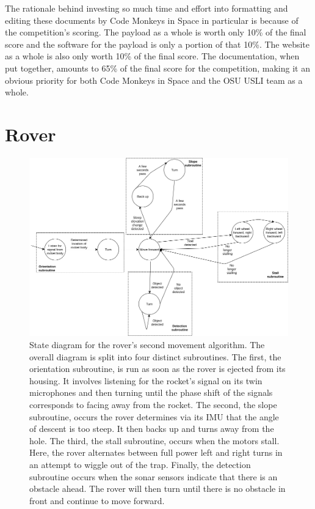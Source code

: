 \documentclass[onecolumn, draftclsnofoot,10pt, compsoc]{IEEEtran}
\begin{document}
The rationale behind investing so much time and effort into formatting and editing these documents by Code Monkeys in Space in particular is because of the competition's scoring. The payload as a whole is worth only 10\% of the final score and the software for the payload is only a portion of that 10\%. The website as a whole is also only worth 10\% of the final score. The documentation, when put together, amounts to 65\% of the final score for the competition, making it an obvious priority for both Code Monkeys in Space and the OSU USLI team as a whole.

\section{Rover}
\begin{figure}[h]
	\begin{center}
		\caption{State diagram for the rover's second movement algorithm. The overall diagram is split into four distinct subroutines. The first, the orientation subroutine, is run as soon as the rover is ejected from its housing. It involves listening for the rocket's signal on its twin microphones and then turning until the phase shift of the signals corresponds to facing away from the rocket. The second, the slope subroutine, occurs the rover determines via its IMU that the angle of descent is too steep. It then backs up and turns away from the hole. The third, the stall subroutine, occurs when the motors stall. Here, the rover alternates between full power left and right turns in an attempt to wiggle out of the trap. Finally, the detection subroutine occurs when the sonar sensors indicate that there is an obstacle ahead. The rover will then turn until there is no obstacle in front and continue to move forward.}
		\includegraphics[width=\textwidth]{RoverStateDiagram}
	\end{center}
\end{figure}
\end{document}
